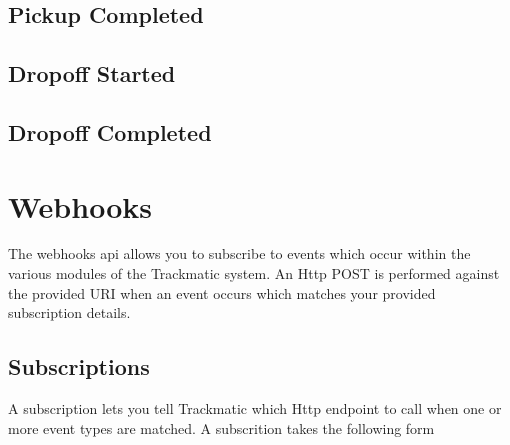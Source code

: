 \documentclass[letterpaper,10pt,english]{sphinxmanual}
\begin{document}
\subsection{Pickup Completed }
\label{\detokenize{loads/web-hooks/payloads:pickup-completed-load-pickup-completed}}
\begin{sphinxVerbatim}[commandchars=\\\{\}]

\end{sphinxVerbatim}


\subsection{Dropoff Started }
\label{\detokenize{loads/web-hooks/payloads:dropoff-started-load-dropoff-started}}
\begin{sphinxVerbatim}[commandchars=\\\{\}]

\end{sphinxVerbatim}


\subsection{Dropoff Completed }
\label{\detokenize{loads/web-hooks/payloads:dropoff-completed-load-dropoff-completed}}
\begin{sphinxVerbatim}[commandchars=\\\{\}]

\end{sphinxVerbatim}


\section{Webhooks}
\label{\detokenize{webhooks/web-hooks:webhooks}}\label{\detokenize{webhooks/web-hooks::doc}}
The webhooks api allows you to subscribe to events which occur within the various modules of the Trackmatic system. An Http POST is performed against the provided URI when an event occurs which matches your provided subscription details.


\subsection{Subscriptions}
\label{\detokenize{webhooks/web-hooks:subscriptions}}
A subscription lets you tell Trackmatic which Http endpoint to call when one or more event types are matched. A subscrition takes the following form
\end{document}
